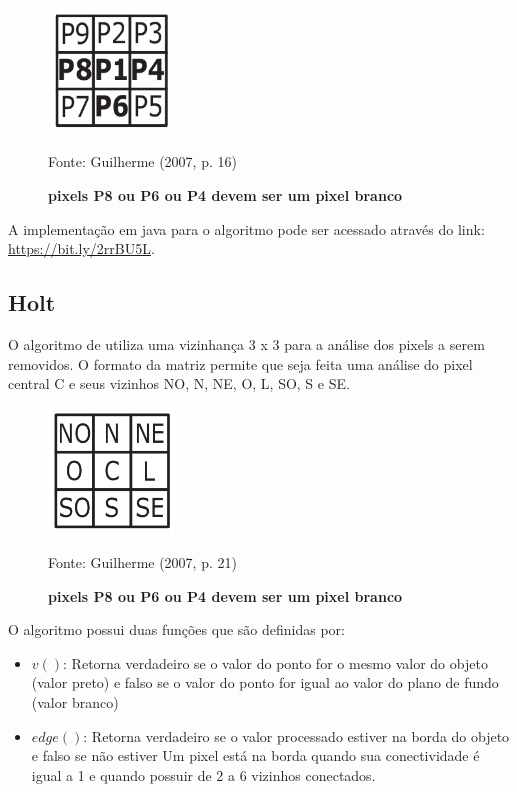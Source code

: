 \documentclass[
	12pt,				%
	oneside,			%
	a4paper,			%
	english,			%
	french,				%
	spanish,			%
	brazil,				%
	]{abntex2}
\begin{document}
\begin{figure}[ht]
\centering
\caption{\textbf{pixels P8 ou P6 ou P4 devem ser um pixel branco}}
\includegraphics[width=0.3\textwidth]{imagens/zhangsuen4.png}

Fonte: Guilherme (2007, p. 16)
\label{fig:zhangsuen4}
\end{figure}

A implementação em java para o algoritmo pode ser acessado através do link: \url{https://bit.ly/2rrBU5L}.

\subsection{Holt}    

O algoritmo de \citet{holt1987improved} utiliza uma vizinhança 3 x 3 para a análise dos pixels a serem removidos. O formato da matriz permite que seja feita uma análise do pixel central C e seus vizinhos NO, N, NE, O, L, SO, S e SE.

\begin{figure}[ht]
\centering
\caption{\textbf{pixels P8 ou P6 ou P4 devem ser um pixel branco}}
\includegraphics[width=0.3\textwidth]{imagens/holt.png}

Fonte: Guilherme (2007, p. 21)
\label{fig:holt}
\end{figure}

O algoritmo possui duas funções que são definidas por:

\begin{itemize}
\item \(v()\): Retorna verdadeiro se o valor do ponto for o mesmo valor do objeto (valor preto) e falso se o valor do ponto for igual ao valor do plano de fundo (valor branco)
\item \(edge()\): Retorna verdadeiro se o valor processado estiver na borda do objeto e falso se não estiver
\subitem Um pixel está na borda quando sua conectividade é igual a 1 e quando possuir de 2 a 6 vizinhos conectados. 
\end{itemize}
\end{document}
